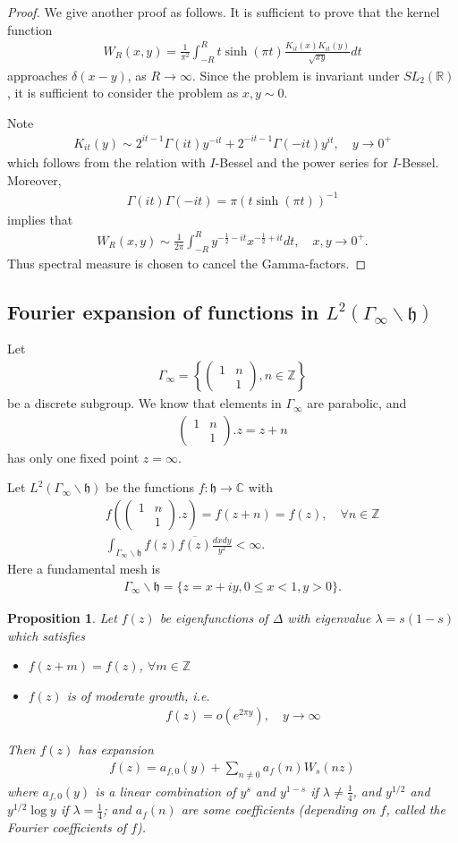 \documentclass[11pt,reqno]{amsart}
\newcommand{\bna}{\begin{eqnarray*}}
\newcommand{\ena}{\end{eqnarray*}}
\newcommand{\bma}{\begin{pmatrix}}
\newcommand{\ema}{\end{pmatrix}}
\newcommand{\mk}{\mathfrak}
\def\C{\mathbb{C}}
\def\R{\mathbb{R}}
\def\Z{\mathbb{Z}}
\newtheorem{prop}[lemma]{Proposition}
\theoremstyle{definition}
\newcommand{\bit}{\begin{itemize}}
\newcommand{\eit}{\end{itemize}}
\begin{document}
\begin{proof}
We give another proof as follows. It is sufficient to prove that the kernel function
\bna
W_R(x,y)=\frac{1}{\pi^2}\int_{-R}^Rt \sinh(\pi t)
\frac{K_{it}(x)K_{it}(y)}{\sqrt{xy}}dt
\ena
approaches $\delta(x-y)$, as $R\rightarrow\infty$.
Since the problem is invariant under $SL_2(\R)$, it is sufficient to consider the problem as $x,y\sim 0$.

Note
\bna
K_{it}(y)\sim 2^{it-1}\Gamma(it)y^{-it}+2^{-it-1}\Gamma(-it)y^{it},\quad y\rightarrow 0^+
\ena
which follows from the relation with $I$-Bessel and the power series for $I$-Bessel.
Moreover,
\bna
\Gamma(it)\Gamma(-it)=\pi (t\sinh(\pi t))^{-1}
\ena
implies that
\bna
W_R(x,y)\sim \frac{1}{2\pi}\int_{-R}^Ry^{-\frac{1}{2}-it}x^{-\frac{1}{2}+it}dt,
\quad x,y\rightarrow 0^+.
\ena
Thus spectral measure is chosen to cancel the Gamma-factors.
\end{proof}
\subsection{Fourier expansion of functions
in $L^2(\Gamma_\infty\backslash \mk h)$}
Let
\bna
\Gamma_\infty=\left\{\bma 1&n\\&1\ema, n\in \Z\right\}
\ena
be a discrete subgroup. We know that elements in $\Gamma_\infty$
are parabolic, and
\bna
\bma 1&n\\&1\ema.z=z+n
\ena
has only one fixed point $z=\infty$.

Let $L^2(\Gamma_\infty\backslash \mk h)$
be the functions  $f:\mk h\rightarrow \C$
with
\bna
&&f\left(\bma 1&n\\&1\ema.z\right)=f(z+n)=f(z),\quad\forall n\in \Z\\
&&\int_{\Gamma_\infty\backslash \mk h}f(z)\overline{f(z)}\frac{dxdy}{y^2}<\infty.
\ena
Here a fundamental mesh is
\bna
\Gamma_\infty\backslash\mk h=\{z=x+iy, 0\leq x<1, y>0\}.
\ena

\begin{prop}
Let $f(z)$ be eigenfunctions of $\Delta$ with eigenvalue
$\lambda=s(1-s)$ which satisfies
\bit
\item $f(z+m)=f(z)$, $\forall m\in \Z$
\item $f(z)$ is of moderate growth, i.e.
\bna
f(z)=o\left(e^{2\pi y}\right),\quad y\rightarrow\infty
\ena
\eit
Then $f(z)$ has expansion
\bna
f(z)=a_{f,0}(y)+\sum_{n\neq 0}a_{f}(n) W_s(nz)
\ena
where $a_{f,0}(y)$ is a linear combination of
$y^s$ and $y^{1-s}$ if $\lambda\neq \frac{1}{4}$,
and $y^{1/2}$ and $y^{1/2}\log y$ if $\lambda=\frac{1}{4}$; and $a_{f}(n)$
are some coefficients (depending on $f$, called the Fourier coefficients of $f$).
\end{prop}
\end{document}
